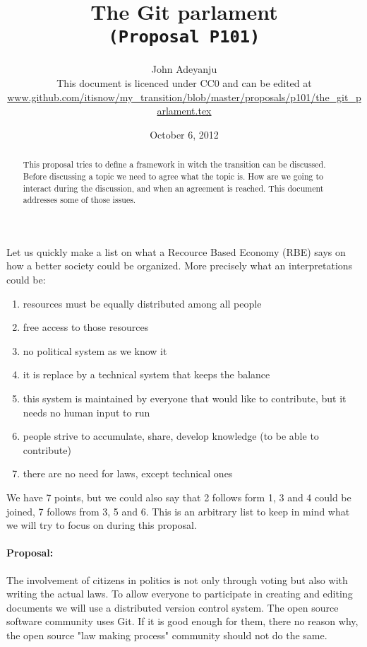 \documentclass{article}
\begin{document}
\title{The Git parlament\\\tt{\small{(Proposal P101)}}\\\tt{\small{}}}%
\author{John Adeyanju\\\small{This document is licenced under CC0 and can be edited at}\\ \scriptsize{\url{www.github.com/itisnow/my_transition/blob/master/proposals/p101/the_git_parlament.tex}}}
\date{October 6, 2012}

\maketitle

\begin{abstract}
This proposal tries to define a framework in witch the transition can be discussed.
Before discussing a topic we need to agree what the topic is.
How are we going to interact during the discussion, and when an agreement is reached.
This document addresses some of those issues.
\end{abstract}

Let us quickly make a list on what a Recource Based Economy (RBE)\cite{rbe}\cite{tzfs} says on how a better society could be organized.
More precisely what an interpretations could be:
\begin{enumerate}
\item resources must be equally distributed among all people
\item free access to those resources
\item no political system as we know it
\item it is replace by a technical system that keeps the balance
\item this system is maintained by everyone that would like to contribute, but it needs no human input to run
\item people strive to accumulate, share, develop knowledge (to be able to contribute)
\item there are no need for laws, except technical ones
\end{enumerate}
We have 7 points, but we could also say that 2 follows form 1, 3 and 4 could be joined, 7 follows from 3, 5 and 6.
This is an arbitrary list to keep in mind what we will try to focus on during this proposal.

\paragraph{Proposal:}
The involvement of citizens in politics is not only through voting but also with writing the actual laws.
To allow everyone to participate in creating and editing documents we will use a distributed version control system.
The open source software community uses Git.
If it is good enough for them, there no reason why, the open source "law making process" community should not do the same.
\end{document}
